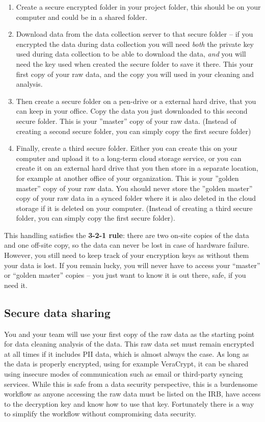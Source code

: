 \begin{enumerate}
	\item Create a secure encrypted folder in your project folder, this should be on
	your computer and could be in a shared folder.
	\item Download data from the data collection server to that secure folder -- if
	you encrypted the data during data collection you will need \textit{both} the
	private key used during data collection to be able to download the data, \textit{and}
	you will need the key used when created the secure folder to save it there. This
	your first copy of your raw data, and the copy you will used in your cleaning and analysis.
	\item Then create a secure folder on a pen-drive or a external hard drive, that you
	can keep in your office. Copy the data you just downloaded to this second secure
	folder. This is your ''master'' copy of your raw data. (Instead of creating a second
	secure folder, you can simply copy the first secure folder)
	\item Finally, create a third secure folder. Either you can create this on your
	computer and upload it to a long-term cloud storage service, or you can create it on
	an external hard drive that you then store in a separate location, for example at
	another office of your organization. This is your ''golden master'' copy of your raw
	data. You should never store the ''golden master'' copy of your raw data in a synced
	folder where it is also deleted in the cloud storage if it is deleted on your computer.
	(Instead of creating a third secure folder, you can simply copy the first secure folder).
\end{enumerate}

\noindent This handling satisfies the \textbf{3-2-1 rule}: there are
two on-site copies of the data and one off-site copy, so the data can never
be lost in case of hardware failure. However, you still
need to keep track of your encryption keys as without them your data is lost. 
If you remain lucky, you will never have to access your ``master'' or ``golden master''
copies -- you just want to know it is out there, safe, if you need it.

\subsection{Secure data sharing}
You and your team will use your first copy of the raw data as the starting point for data 
cleaning analysis of the data. This raw data set must remain encrypted at all times if it 
includes PII data, which is almost always the case. As long as the data is properly encrypted,
using for example VeraCrypt, it can be shared using insecure modes of communication such as
email or third-party syncing services. While this is safe from a data security perspective, 
this is a burdensome workflow as anyone accessing the raw data must be listed on the IRB, 
have access to the decryption key and know how to use that key. Fortunately there is a way 
to simplify the workflow without compromising data security.

